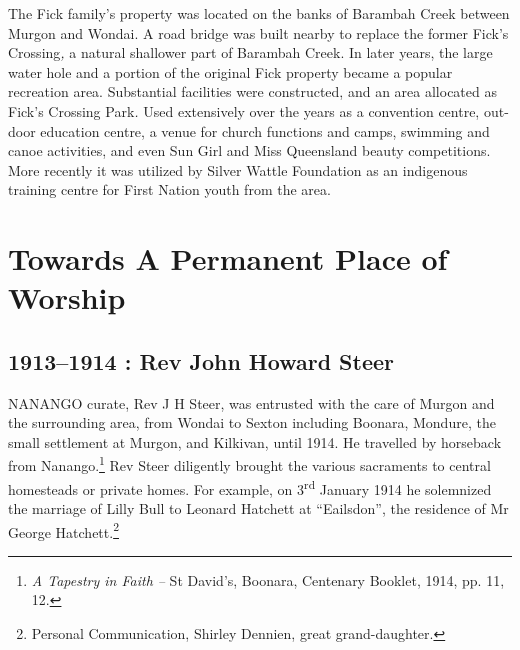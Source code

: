The Fick family's property was located on the banks of Barambah Creek between Murgon and Wondai. A road bridge was built nearby to replace the former Fick's Crossing\emph{,} a natural shallower part of Barambah Creek. In later years, the large water hole and a portion of the original Fick property became a popular recreation area. Substantial facilities were constructed, and an area allocated as Fick's Crossing Park\emph{.} Used extensively over the years as a convention centre, out-door education centre, a venue for church functions and camps, swimming and canoe activities, and even Sun Girl and Miss Queensland beauty competitions. More recently it was utilized by Silver Wattle Foundation as an indigenous training centre for First Nation youth from the area.



\balance


\printendnotes[custom]
\setcounter{endnote}{0}
\chapter{Towards A Permanent Place of Worship}
\nobalance


\section{1913--1914 : Rev John Howard Steer}



\lettrine[lines=3]{N}{ANANGO}
 curate, Rev J H Steer, was entrusted with the care of Murgon and the surrounding area, from Wondai to Sexton including Boonara, Mondure, the small settlement at Murgon, and Kilkivan, until 1914. He travelled by horseback from Nanango.\footnote{\emph{A Tapestry in Faith --} St David's, Boonara, Centenary Booklet, 1914, pp. 11, 12.} Rev Steer diligently brought the various sacraments to central homesteads or private homes. For example, on 3\textsuperscript{rd} January 1914 he solemnized the marriage of Lilly Bull to Leonard Hatchett at ``Eailsdon'', the residence of Mr George Hatchett.\footnote{Personal Communication, Shirley Dennien, great grand-daughter.}







